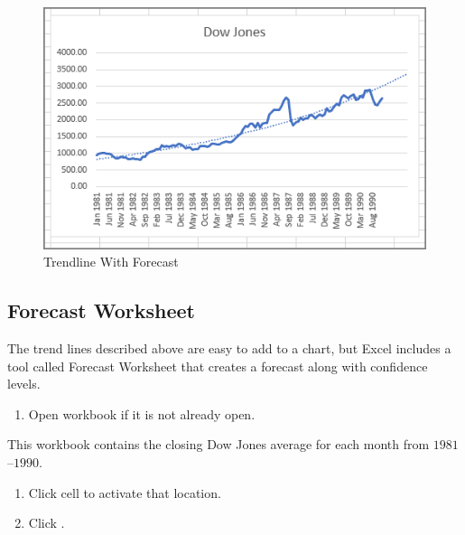 \begin{figure}[H]
	\centering
	\includegraphics[width=\maxwidth{.95\linewidth}]{gfx/ch08_fig11}
	\caption{Trendline With Forecast}
	\label{08:fig11}
\end{figure}

\subsection{Forecast Worksheet}

The trend lines described above are easy to add to a chart, but Excel includes a tool called Forecast Worksheet that creates a forecast along with confidence levels.

\begin{enumerate}
	\item Open workbook  if it is not already open.
\end{enumerate}

This workbook contains the closing Dow Jones average for each month from $ 1981 $–$ 1990 $.

\begin{enumerate}[resume]
	\item Click cell  to activate that location.
	\item Click .
\end{enumerate}


